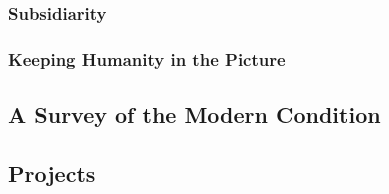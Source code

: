 \documentclass[letterpaper]{article}
\begin{document}
\subsubsection{Subsidiarity}

\subsubsection{Keeping Humanity in the Picture}

\subsection{A Survey of the Modern Condition}

\subsection{Projects}
\end{document}
